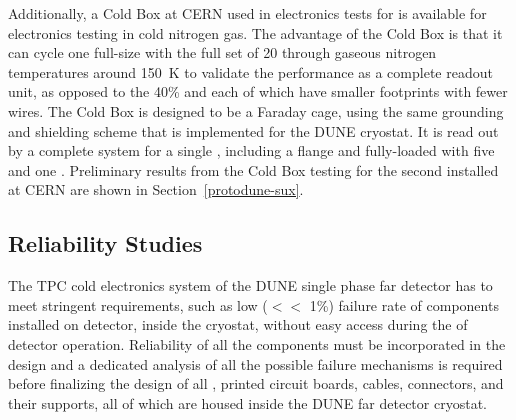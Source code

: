 Additionally, a Cold Box at CERN used in electronics tests for  is available for electronics testing 
in cold nitrogen gas. The advantage of the Cold Box is that it can cycle one full-size  with the full 
set of \num{20}  through gaseous nitrogen temperatures around \SI{150}{K} to validate the  
performance as a complete  readout unit, as opposed to the 40\%  and  each of which have smaller
 footprints with fewer wires. The Cold Box is designed to be a Faraday cage, using the same grounding 
and shielding scheme that is implemented for the DUNE \single cryostat. It is read out by a complete  
system for a single , including a  flange and fully-loaded 
 with five  and one . Preliminary results from the  Cold Box testing 
for the second  installed at CERN are shown in Section~\ref{protodune-sux}.

\subsection{Reliability Studies}
\label{sec:fdsp-tpcelec-qa-reliability}

The TPC cold electronics system of the DUNE single phase far detector has to meet stringent requirements, such as low ($<<$ 1\%) failure rate of components installed on detector, inside the cryostat, without easy access during the \dunelifetime of detector operation. Reliability of all the components must be incorporated in the design and a dedicated analysis of all the possible failure mechanisms is required before finalizing the design of all , printed circuit boards, cables, connectors, and their supports, all of which are housed inside the DUNE far detector cryostat. 

